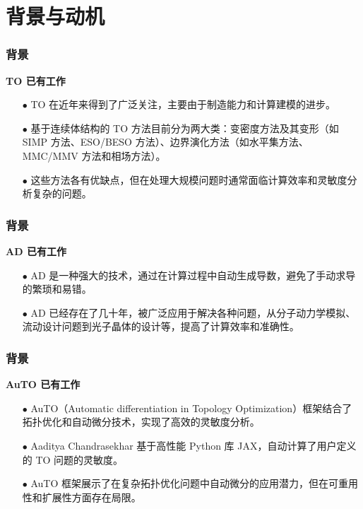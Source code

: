\documentclass{beamer}
\numberwithin{subsection}{section}
\begin{document}
\section{背景与动机}

\begin{frame}
    \frametitle{背景}
    \textbf{TO 已有工作}
    \begin{itemize}
	    \item[$\bullet$] TO 在近年来得到了广泛关注，主要由于制造能力和计算建模的进步。
	    \vspace{0.3cm}
	    \item[$\bullet$] 基于连续体结构的 TO 方法目前分为两大类：变密度方法及其变形（如 SIMP 方法、ESO/BESO 方法）、边界演化方法（如水平集方法、MMC/MMV 方法和相场方法）。
	    \vspace{0.3cm}
	    \item[$\bullet$] 这些方法各有优缺点，但在处理大规模问题时通常面临计算效率和灵敏度分析复杂的问题。
    \end{itemize}
\end{frame}

\begin{frame}
	\frametitle{背景}
    \textbf{AD 已有工作}
    \begin{itemize}
	    \item[$\bullet$] AD 是一种强大的技术，通过在计算过程中自动生成导数，避免了手动求导的繁琐和易错。
	    \vspace{0.3cm}
	    \item[$\bullet$] AD 已经存在了几十年，被广泛应用于解决各种问题，从分子动力学模拟、流动设计问题到光子晶体的设计等，提高了计算效率和准确性。
    \end{itemize}
\end{frame}

\begin{frame}

	\frametitle{背景}
    \textbf{AuTO 已有工作}
    \begin{itemize}
	    \item[$\bullet$] AuTO（Automatic differentiation in Topology Optimization）框架结合了拓扑优化和自动微分技术，实现了高效的灵敏度分析。
	    \vspace{0.3cm}
	    \item[$\bullet$] Aaditya Chandrasekhar 基于高性能 Python 库 JAX，自动计算了用户定义的 TO 问题的灵敏度。
	    \vspace{0.3cm}
	    \item[$\bullet$] AuTO 框架展示了在复杂拓扑优化问题中自动微分的应用潜力，但在可重用性和扩展性方面存在局限。
    \end{itemize}
    
\end{frame}
\end{document}
